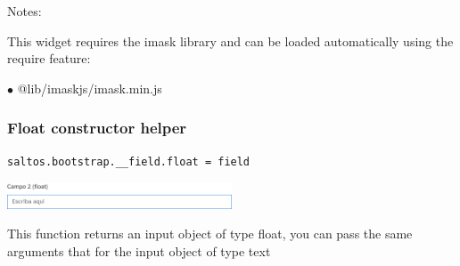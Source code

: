 \documentclass[a4paper]{article}
\begin{document}
Notes:

This widget requires the imask library and can be loaded automatically using the require
feature:

\begin{compactitem}
\item[\color{myblue}$\bullet$] @lib/imaskjs/imask.min.js
\end{compactitem}

\hypertarget{toc53}{}
\subsubsection{Float constructor helper}

\begin{lstlisting}
saltos.bootstrap.__field.float = field
\end{lstlisting}

\begin{center}\includegraphics[width=0.5\textwidth]{../ujest/snaps/test-bootstrap-js-bootstrap-campo-2-float-1-snap.png}\end{center}

This function returns an input object of type float, you can pass the same arguments
that for the input object of type text
\end{document}
